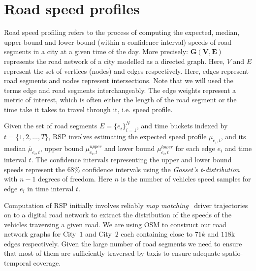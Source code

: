 \section{Road speed profiles}
\label{subsec:road-speed-profile}

Road speed profiling refers to the process of computing the expected, median, upper-bound and lower-bound (within a confidence interval) speeds of road segments in a city at a given time of the day. 
More precisely: $\mathbf{G(V,E)}$ represents the road network of a city modelled as a directed graph. Here, $V$ and $E$ represent the set of vertices (nodes) and edges respectively. Here, edges represent road segments and nodes represent intersections. Note that we will used the terms edge and road segments interchangeably. The edge weights represent a metric of interest, which is often either the length of the road segment or the time take it takes to travel through it, i.e. speed profile. 

Given the set of road segments $E = \{e_i\}_{i=1}^{N}$, and time buckets indexed by $t =\{1,2,\ldots, T\}$, \ac{RSP} involves estimating the expected speed profile $\mu_{e_i,t}$, and its median $\bar{\mu}_{e_i,t}$, upper bound $\mu^{upper}_{e_i,t}$ and lower bound $\mu^{lower}_{e_i,t}$ for each edge $e_i$ and time interval $t$. The confidence intervals representing the upper and lower bound speeds represent the $68\%$ confidence intervals using the \emph{Gosset's t-distribution} with $n-1$ degrees of freedom. Here $n$ is the number of vehicles speed samples for edge $e_i$ in time interval $t$.


Computation of \ac{RSP} initially involves reliably {\it map matching}~\cite{quddus2007current,sunderrajan2014map} driver trajectories on to a digital road network to extract the distribution of the speeds of the vehicles traversing a given road. We are using \ac{OSM} to construct our road network graphs for City~$1$ and City~$2$ each containing close to $71k$ and $118$k edges respectively. Given the large number of road segments we need to ensure that most of them are sufficiently traversed by taxis to ensure adequate spatio-temporal coverage.




